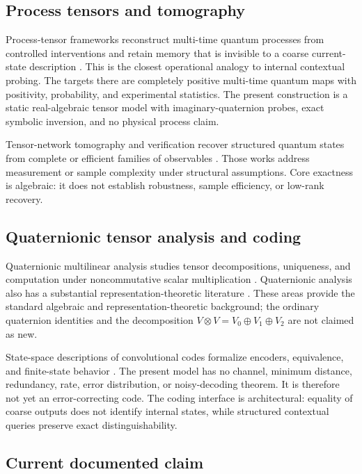 \subsection{Process tensors and tomography}

Process-tensor frameworks reconstruct multi-time quantum processes from controlled interventions and retain memory that is invisible to a coarse current-state description \cite{pollock2015,pollock2018,xiang2021}.  This is the closest operational analogy to internal contextual probing.  The targets there are completely positive multi-time quantum maps with positivity, probability, and experimental statistics.  The present construction is a static real-algebraic tensor model with imaginary-quaternion probes, exact symbolic inversion, and no physical process claim.

Tensor-network tomography and verification recover structured quantum states from complete or efficient families of observables \cite{cruz2021,lidiak2022}.  Those works address measurement or sample complexity under structural assumptions.  Core exactness is algebraic: it does not establish robustness, sample efficiency, or low-rank recovery.

\subsection{Quaternionic tensor analysis and coding}

Quaternionic multilinear analysis studies tensor decompositions, uniqueness, and computation under noncommutative scalar multiplication \cite{flamant2024}.  Quaternionic analysis also has a substantial representation-theoretic literature \cite{frenkel2007,frenkel2019}.  These areas provide the standard algebraic and representation-theoretic background; the ordinary quaternion identities and the decomposition $V\otimes V=V_0\oplus V_1\oplus V_2$ are not claimed as new.

State-space descriptions of convolutional codes formalize encoders, equivalence, and finite-state behavior \cite{gluesing2006,holub2017}.  The present model has no channel, minimum distance, redundancy, rate, error distribution, or noisy-decoding theorem.  It is therefore not yet an error-correcting code.  The coding interface is architectural: equality of coarse outputs does not identify internal states, while structured contextual queries preserve exact distinguishability.

\subsection{Current documented claim}

